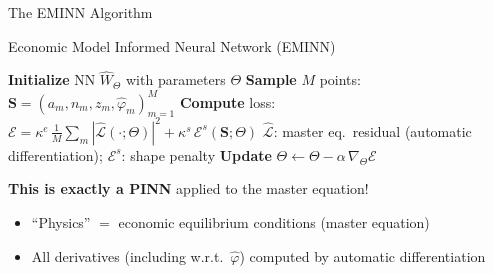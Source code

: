 \documentclass[aspectratio=169,11pt]{beamer}
\newcommand{\emphc}[1]{\textcolor{harvardcrimson}{#1}}
\begin{document}
\begin{frame}{The EMINN Algorithm}
\begin{block}{Economic Model Informed Neural Network (EMINN)}
\footnotesize
\begin{algorithmic}[1]
\STATE \textbf{Initialize} NN $\hat{W}_\Theta$ with parameters $\Theta$
\STATE \textbf{Sample} $M$ points: $\bm{S} = (a_m, n_m, z_m, \hat{\varphi}_m)_{m=1}^M$
    \STATE \textbf{Compute} loss: $\mathcal{E} = \kappa^e\,\tfrac{1}{M}\sum_{m} |\hat{\mathcal{L}}(\cdot; \Theta)|^2 + \kappa^s\,\mathcal{E}^s(\bm{S}; \Theta)$
\STATE \quad $\hat{\mathcal{L}}$: master eq.\ residual (automatic differentiation); \; $\mathcal{E}^s$: shape penalty
    \STATE \textbf{Update} $\Theta \leftarrow \Theta - \alpha\,\nabla_\Theta\mathcal{E}$
\ENDWHILE
\end{algorithmic}
\end{block}

\vspace{0.2em}
\small
\textbf{This is exactly a PINN} applied to the master equation!
\begin{itemize}\itemsep0pt
    \item ``Physics'' $=$ economic equilibrium conditions (master equation)
    \item All derivatives (including w.r.t.\ $\hat{\varphi}$) computed by \emphc{automatic differentiation}
\end{itemize}
\end{frame}
\end{document}
